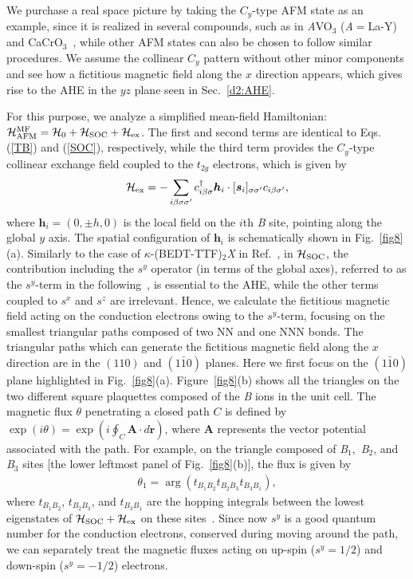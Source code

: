 \documentclass[aps,twocolumn,prb,preprintnumbers,amsmath,amssymb]{revtex4-2}
\begin{document}
We purchase a real space picture by taking the $C_y$-type AFM state as an example, since it is realized in several compounds, such as in {\it A}VO$_3$ ({\it A}$=$La-Y)~\cite{miyasaka} and CaCrO$_3$~\cite{komarek}, while other AFM states can also be chosen to follow similar procedures. 
We assume the collinear $C_y$ pattern without other minor components and see how a fictitious magnetic field along the $x$ direction appears, which gives rise to the AHE in the $yz$ plane seen in Sec.~\ref{d2:AHE}.

For this purpose, we analyze a simplified mean-field Hamiltonian: ${\cal H}_{\rm AFM}^{\rm MF} = {\cal H}_{\rm 0} + {\cal H}_{\rm SOC} + {\cal H}_{\rm ex}$.
The first and second terms are identical to Eqs. (\ref{TB}) and (\ref{SOC}), respectively, 
 while the third term provides the $C_y$-type collinear exchange field coupled to the $t_{2g}$ electrons, which is given by
\begin{align}
{\cal H}_{\rm ex} = - \sum_{i \beta \sigma \sigma'} c_{i \beta \sigma}^\dagger {\bm h}_i \cdot [{\bm s}_i]_{\sigma \sigma'} c_{i \beta \sigma'},
\end{align}
where ${\bm h}_i=(0, \pm h, 0)$ is the local field on the $i$th {\it B} site, pointing along the global $y$ axis.
The spatial configuration of ${\bm h}_i$ is schematically shown in Fig.~\ref{fig8}(a). 
Similarly to the case of $\kappa$-(BEDT-TTF)$_2${\it X} in Ref.~\cite{naka2}, in ${\cal H}_{\rm SOC}$, the contribution including the $s^y$ operator (in terms of the global axes), referred to as the $s^y$-term in the following~\cite{ls}, is essential to the AHE, while the other terms coupled to $s^x$ and $s^z$ are irrelevant.
Hence, we calculate the fictitious magnetic field acting on the conduction electrons owing to the $s^y$-term, focusing on the smallest triangular paths composed of two NN and one NNN bonds. 
The triangular paths which can generate the fictitious magnetic field along the $x$ direction are in the $(110)$ and $(1\bar{1}0)$ planes. 
Here we first focus on the $(1\bar{1}0)$ plane highlighted in Fig.~\ref{fig8}(a). 
Figure~\ref{fig8}(b) shows all the triangles on the two different square plaquettes composed of the {\it B} ions in the unit cell. 
The magnetic flux $\theta$ penetrating a closed path $C$ is defined by $\exp(i \theta) = \exp(i \oint_{C} {\bm A} \cdot d{\bm r})$, where $\bm A$ represents the vector potential associated with the path. 
For example, on the triangle composed of {\it B}$_1, $ {\it B}$_2$, and {\it B}$_3$ sites [the lower leftmost panel of Fig.~\ref{fig8}(b)], the flux is given by 
\begin{align}
\theta_1 = \arg{(t_{\textit{B}_1\textit{B}_2} t_{\textit{B}_2 \textit{B}_3} t_{\textit{B}_3 \textit{B}_1})},
\end{align}
where $t_{\textit{B}_1\textit{B}_2}$, $ t_{\textit{B}_2 \textit{B}_3} $, and $ t_{\textit{B}_3 \textit{B}_1}$ are the hopping integrals between the lowest eigenstates of ${\cal H}_{\rm SOC} + {\cal H}_{\rm ex}$ on these sites~\cite{ohgushi,tomizawa}.
Since now $s^y$ is a good quantum number for the conduction electrons, conserved during moving around the path, we can separately treat the magnetic fluxes acting on up-spin ($s^y=1/2$) and down-spin ($s^y=-1/2$) electrons.
\end{document}

